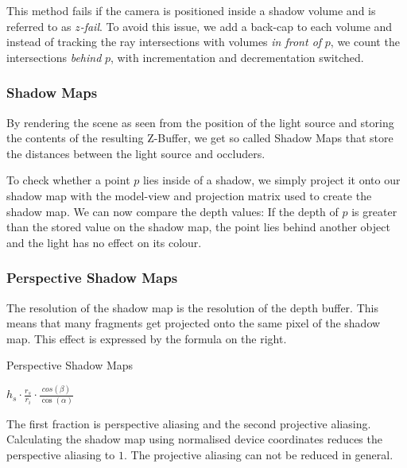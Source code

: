 \documentclass{panikzettel}
\begin{document}
This method fails if the camera is positioned inside a shadow volume and is referred to as \emph{$z$-fail}. To avoid this issue, we add a back-cap to each volume and instead of tracking the ray intersections with volumes \emph{in front of} $p$, we count the intersections \emph{behind} $p$, with incrementation and decrementation switched.

\subsubsection*{Shadow Maps}
By rendering the scene as seen from the position of the light source and storing the contents of the resulting Z-Buffer, we get so called Shadow Maps that store the distances between the light source and occluders.

To check whether a point $p$ lies inside of a shadow, we simply project it onto our shadow map with the model-view and projection matrix used to create the shadow map. We can now compare the depth values: If the depth of $p$ is greater than the stored value on the shadow map, the point lies behind another object and the light has no effect on its colour.

\subsubsection*{Perspective Shadow Maps}
\label{subsubsec::perspectiveShadowMaps}

\begin{halfboxl}
The resolution of the shadow map is the resolution of the depth buffer. This means that many fragments get projected onto the same pixel of the shadow map.
This effect is expressed by the formula on the right.
\end{halfboxl}
\begin{halfboxr}
\vspace{-\baselineskip}
\begin{defi}{Perspective Shadow Maps}
\begin{center}
    $h_s \cdot \frac{r_s}{r_i} \cdot \frac{cos(\beta)}{\cos(\alpha)}$
\end{center}
\end{defi}
\end{halfboxr}

The first fraction is perspective aliasing and the second projective aliasing. Calculating the shadow map using normalised device coordinates reduces the perspective aliasing to $1$. The projective aliasing can not be reduced in general.
\end{document}
